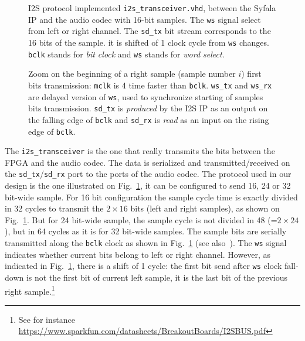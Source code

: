\documentclass[11pt]{article}
\numberwithin{equation}{section}
\numberwithin{figure}{section}
\begin{document}



\begin{figure}[ht]
  
  \caption{I2S  protocol implemented {\tt i2s\_transceiver.vhd}, between the Syfala IP and  the audio codec with 16-bit samples. The {\tt ws} signal select from left or right channel. The {\tt  sd\_tx} bit stream corresponds to the 16 bits of the sample. it is shifted of 1 clock cycle from {\tt ws} changes. {\tt bclk} stands for {\em bit clock} and {\tt ws} stands for {\em word select}.}
  \label{figi2s}
\end{figure}

\begin{figure}[ht]
  
  \caption{Zoom on the beginning of a right sample  (sample number $i$) first bits transmission: {\tt mclk} is 4 time faster than {\tt bclk}. {\tt ws\_tx} and {\tt ws\_rx} are delayed version of {\tt ws}, used to synchronize starting of  samples bits transmission. {\tt sd\_tx} is {\em produced} by the I2S IP as an output on the falling edge of {\tt bclk} and {\tt sd\_rx} is {\em read} as an input on the rising edge of {\tt bclk}.}
  \label{figi2szoom1}
\end{figure}

The {\tt i2s\_transceiver} is the one that really transmits the bits between the FPGA and the audio codec. The data is serialized and transmitted/received on the {\tt sd\_tx}/{\tt sd\_rx} port to the ports of the audio codec. The protocol used in our design is the one illustrated on Fig.~\ref{figi2s}, it can be configured to send 16, 24 or 32 bit-wide sample. For 16 bit configuration the sample cycle time is exactly divided in 32 cycles to transmit the $2\times16$ bits (left and right samples), as shown on Fig.~\ref{figi2s}. But for 24 bit-wide sample, the sample cycle is not divided in 48 (=$2\times24$), but in 64 cycles as it is for 32  bit-wide samples.  The sample bits are serially transmitted along the {\tt bclk} clock as shown in Fig.~\ref{figi2s} (see also~\cite{ssm2603}). The {\tt ws} signal indicates whether current bits belong to  left or right channel. However, as indicated in Fig.~\ref{figi2s}, there is a shift of 1 cycle: the first bit send after {\tt ws} clock fall-down is not the first bit of current left sample, it is the last bit of the previous right sample.\footnote{See for instance \url{https://www.sparkfun.com/datasheets/BreakoutBoards/I2SBUS.pdf}}
\end{document}
